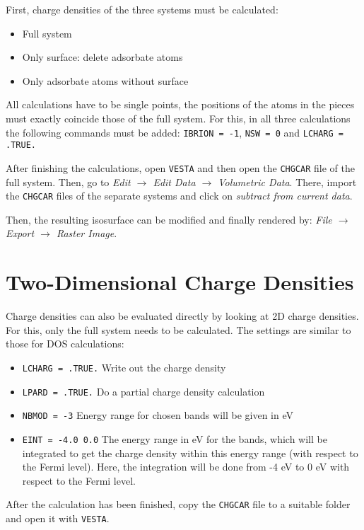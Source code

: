 \documentclass[a4paper,11pt]{article}
\begin{document}
First, charge densities of the three systems must be calculated:

\begin{itemize}
 \item Full system
 \item Only surface: delete adsorbate atoms 
 \item Only adsorbate atoms without surface
\end{itemize}

All calculations have to be single points, the positions of the atoms in the pieces must exactly coincide 
those of the full system. 
For this, in all three calculations the following commands must be added: \texttt{IBRION = -1}, \texttt{NSW = 0}
and \texttt{LCHARG = .TRUE.}

After finishing the calculations, open \texttt{VESTA} and then open the \texttt{CHGCAR} file of the full system.
Then, go to \textit{Edit $\rightarrow$ Edit Data $\rightarrow$ Volumetric Data}. There, import the \texttt{CHGCAR} files of the separate systems and
click on \textit{subtract from current data}.

Then, the resulting isosurface can be modified and finally rendered by: \textit{File $\rightarrow$ Export $\rightarrow$ Raster Image}.


\section{Two-Dimensional Charge Densities}

Charge densities can also be evaluated directly by looking at 2D charge densities.
For this, only the full system needs to be calculated.
The settings are similar to those for DOS calculations:

\begin{itemize}
 \item \texttt{LCHARG = .TRUE.} Write out the charge density
 \item \texttt{LPARD = .TRUE.} Do a partial charge density calculation
 \item \texttt{NBMOD = -3} Energy range for chosen bands will be given in eV
 \item \texttt{EINT = -4.0  0.0} The energy range in eV for the bands, which will be integrated
 to get the charge density within this energy range (with respect to the Fermi level).
 Here, the integration will be done from -4 eV to 0 eV with respect to the Fermi level.
\end{itemize}

After the calculation has been finished, copy the \texttt{CHGCAR} file to a suitable
folder and open it with \texttt{VESTA}.
\end{document}
